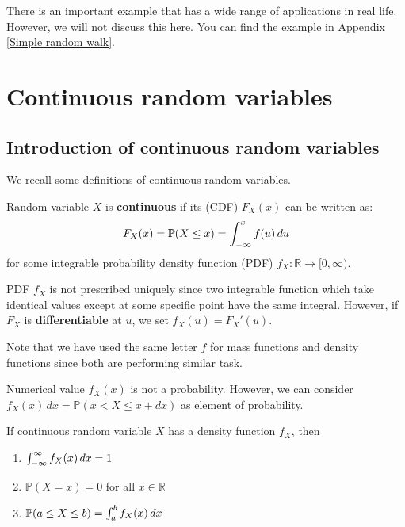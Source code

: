 \documentclass{huhtakm-template-book}
\newcommand{\prob}{\mathbb{P}}
\begin{document}
There is an important example that has a wide range of applications in real life. However, we will not discuss this here. You can find the example in Appendix \ref{Simple random walk}.

\chapter{Continuous random variables}
\section{Introduction of continuous random variables}
We recall some definitions of continuous random variables.
\begin{defn}
	Random variable $X$ is \textbf{continuous} if its  (CDF) $F_{X}(x)$ can be written as:
	\begin{equation*}
		F_{X}(x)=\prob(X\leq x)=\intlu{-\infty}{x}f(u)\,du
	\end{equation*}
	for some integrable probability density function (PDF) $f_{X}:\mathbb{R}\to[0,\infty)$.
\end{defn}
\begin{rem}
	PDF $f_{X}$ is not prescribed uniquely since two integrable function which take identical values except at some specific point have the same integral. However, if $F_{X}$ is \textbf{differentiable} at $u$, we set $f_{X}(u)=F_{X}'(u)$.
\end{rem}
Note that we have used the same letter $f$ for mass functions and density functions since both are performing similar task.
\begin{rem}
	Numerical value $f_{X}(x)$ is not a probability. However, we can consider $f_{X}(x)\,dx=\prob(x<X\leq x+dx)$ as element of probability.
\end{rem}
\begin{lem}
	\label{properties of density function}
	If continuous random variable $X$ has a density function $f_{X}$, then
	\begin{enumerate}
		\item $\int_{-\infty}^{\infty} f_{X}(x)\,dx=1$
		\item $\prob(X=x)=0$ for all $x\in\mathbb{R}$
		\item $\prob(a\leq X\leq b)=\intlu{a}{b}f_{X}(x)\,dx$
	\end{enumerate}
\end{lem}
\end{document}
